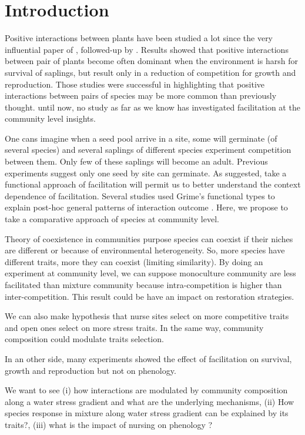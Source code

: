 \documentclass[12pt]{article} %
\begin{document}
\section{Introduction}

Positive interactions between plants have been studied a lot since the very influential paper of \citep{Bertness1994}, followed-up by \citep{Bruno2003}. Results showed that positive interactions between pair of plants become often dominant when the environment is harsh for survival of saplings, but result only in a reduction of competition for growth and reproduction\citep{He2013}. Those studies were successful in highlighting that positive interactions between pairs of species may be more common than previously thought. until now, no study as far as we know has investigated facilitation at the community level insights. 

One cans imagine when a seed pool arrive in a site, some will germinate (of several species) and several saplings of different species experiment competition between them. Only few of these saplings will become an adult. Previous experiments suggest only one seed by site can germinate. As \citet{Butterfield2013} suggested, take a functional approach of facilitation will permit us to better understand the context dependence of facilitation. Several studies used Grime's functional types to explain post-hoc general patterns of interaction outcome \citep{Maestre2009,Butterfield2013}. Here, we propose to take a comparative approach of species at community level.

Theory of coexistence in communities purpose species can coexist if their niches are different or because of environmental heterogeneity. So, more species have different traits, more they can coexist (limiting similarity). By doing an experiment at community level, we can suppose monoculture community are less facilitated than mixture community because intra-competition is higher than inter-competition. This result could be have an impact on restoration strategies.

We can also make hypothesis that nurse sites select on more competitive traits and open ones select on more stress traits. In the same way, community composition could modulate traits selection.

In an other side, many experiments showed the effect of facilitation on survival, growth and reproduction but not on phenology. 

We want to see (i) how interactions are modulated by community composition along a water stress gradient and what are the underlying mechanisms, (ii) How species response in mixture along water stress gradient can be explained by its traits?, (iii) what is the impact of nursing on phenology ?
\end{document}
